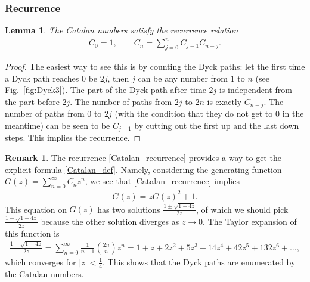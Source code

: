 \documentclass[letterpaper,11pt,oneside,reqno]{amsart}
\numberwithin{equation}{section}
\newtheorem{lemma}[proposition]{Lemma}
\theoremstyle{definition}
\newtheorem{remark}[proposition]{Remark}
\begin{document}

\subsubsection{Recurrence} %
\label{ssub:recurrence}

\begin{lemma}\label{lemma:Dyck_and_recurrence}
The Catalan numbers satisfy the recurrence relation
\begin{align}\label{Catalan_recurrence}
	C_0=1,\qquad
	C_{n}=\sum_{j=0}^n C_{j-1}C_{n-j}.
\end{align}
\end{lemma}
\begin{proof}
	The easiest way to see this is by counting the Dyck paths: let the first time a Dyck path 
	reaches $0$ be $2j$, then $j$ can be any number from $1$ to $n$ (see Fig.~\ref{fig:Dyck3}). 
	The part of the Dyck path after time $2j$ is independent from the 
	part before $2j$. The number of paths 
	from $2j$ to $2n$ is exactly $C_{n-j}$. The 
	number of paths from $0$ to $2j$ 
	(with the condition that they do not get to $0$ in the meantime)
	can be seen to be $C_{j-1}$ by cutting out the first up and the 
	last down steps. This implies the recurrence.
\end{proof}

\begin{remark}\label{rmk:from_recurrence_to_explicit_formula}
	The recurrence \eqref{Catalan_recurrence} provides a way to 
	get the explicit formula \eqref{Catalan_def}. Namely, considering
	the generating function $G(z)=\sum_{n=0}^{\infty}C_n z^{n}$, 
	we see that \eqref{Catalan_recurrence} implies
	\begin{align*}
		G(z)=zG(z)^{2}+1.
	\end{align*}
	This equation on $G(z)$ has two solutions $\frac{1\pm\sqrt{1-4z}}{2z}$, 
	of which we should pick 
	$\frac{1-\sqrt{1-4z}}{2z}$ because the other solution diverges as $z\to0$.
	The Taylor expansion of this function
	is
	\begin{align*}
		\frac{1-\sqrt{1-4z}}{2z}=
		\sum_{n=0}^{\infty}\frac{1}{n+1}\binom{2n}n z^{n}=
		1+z+2 z^2+5 z^3+14 z^4+42 z^5+132 z^6+\ldots,
	\end{align*}
	which converges for $|z|<\frac14$.
	This shows that the Dyck paths are enumerated by the Catalan numbers.
\end{remark}

\end{document}
